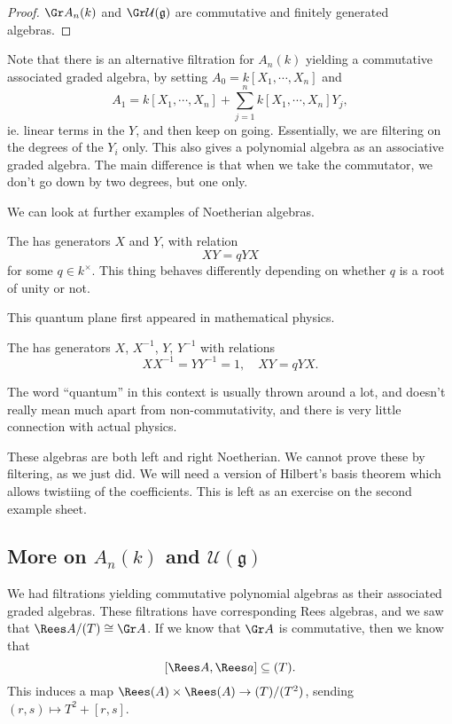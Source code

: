 \documentclass[a4paper]{article}
\begin{document}
\begin{proof}
  $\Gr A_n(k)$ and $\Gr \mathcal{U}(\mathfrak{g})$ are commutative and finitely generated algebras.
\end{proof}

Note that there is an alternative filtration for $A_n(k)$ yielding a commutative associated graded algebra, by setting $A_0 = k[X_1, \cdots, X_n]$ and
\[
  A_1 = k[X_1, \cdots, X_n] + \sum_{j = 1}^n k[X_1, \cdots, X_n] Y_j,
\]
ie. linear terms in the $Y$, and then keep on going. Essentially, we are filtering on the degrees of the $Y_i$ only. This also gives a polynomial algebra as an associative graded algebra. The main difference is that when we take the commutator, we don't go down by two degrees, but one only.

We can look at further examples of Noetherian algebras.
\begin{eg}
  The   has generators $X$ and $Y$, with relation
  \[
    XY = q YX
  \]
  for some $q \in k^\times$. This thing behaves differently depending on whether $q$ is a root of unity or not.
\end{eg}
This quantum plane first appeared in mathematical physics.
\begin{eg}
  The   has generators $X$, $X^{-1}$, $Y$, $Y^{-1}$ with relations
  \[
    XX^{-1} = YY^{-1} = 1,\quad XY = q YX.
  \]
\end{eg}
The word ``quantum'' in this context is usually thrown around a lot, and doesn't really mean much apart from non-commutativity, and there is very little connection with actual physics.

These algebras are both left and right Noetherian. We cannot prove these by filtering, as we just did. We will need a version of Hilbert's basis theorem which allows twistiing of the coefficients. This is left as an exercise on the second example sheet.

\subsection{More on \texorpdfstring{$A_n(k)$}{An(k)} and \texorpdfstring{$\mathcal{U}(\mathfrak{g})$}{U(g)}}
We had filtrations yielding commutative polynomial algebras as their associated graded algebras. These filtrations have corresponding Rees algebras, and we saw that $\Rees A / (T) \cong \Gr A$. If we know that $\Gr A$ is commutative, then we know that
\[
  [\Rees A, \Rees a] \subseteq (T).
\]
This induces a map $\Rees (A) \times \Rees (A) \to (T)/(T^2)$, sending $(r, s) \mapsto T^2 + [r, s]$.
\end{document}
